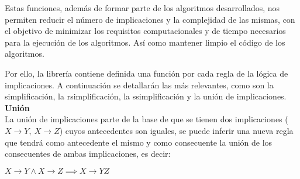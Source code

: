 Estas funciones, adem\'as de formar parte de los algoritmos desarrollados, nos permiten reducir el n\'umero de 
implicaciones y la complejidad de las mismas, con el objetivo de minimizar los requisitos computacionales y de tiempo
necesarios para la ejecuci\'on de los algoritmos. As\'i como mantener limpio el c\'odigo de los algoritmos.










Por ello, la librer\'ia contiene definida una funci\'on por cada regla de la l\'ogica de implicaciones. A continuaci\'on se detallar\'an las m\'as relevantes, como son la simplificaci\'on, la rsimplificaci\'on, la ssimplificaci\'on y la uni\'on de implicaciones.\\

\textbf{Uni\'on}\\
La uni\'on de implicaciones parte de la base de que se tienen dos implicaciones (\(X \to Y, \ X \to Z\)) cuyos antecedentes son iguales, se puede inferir una nueva regla que tendr\'a como antecedente el mismo y como consecuente la uni\'on de los consecuentes de ambas implicaciones, es decir:

\begin{center}
    \(X \to Y \wedge X \to Z \implies X \to YZ \)
\end{center}

